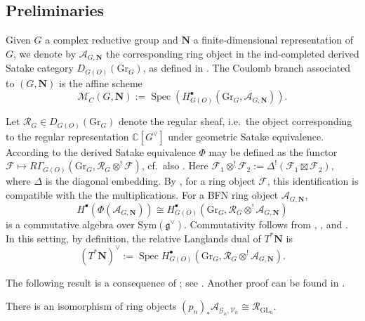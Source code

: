 \documentclass[11pt]{amsart}
\theoremstyle{definition}
\theoremstyle{plain}
\theoremstyle{remark}
\newcommand{\GL}{\mathrm{GL}}
\newcommand{\numberset}{\mathbb}
\newcommand{\C}{\numberset{C}}
\newcommand{\g}{\mathfrak{g}}
\DeclareMathOperator{\spec}{Spec}
\begin{document}
    \subsection{Preliminaries} Given $G$ a complex reductive group and $\mathbf{N}$ a finite-dimensional representation of $G$, we denote by $\mathcal{A}_{G,\mathbf{N}}$ the corresponding ring object in the ind-completed derived Satake category $D_{G(O)}(\mathrm{Gr}_G)$, as defined in \cite{BFN2018,BFN-Ring}. The Coulomb branch associated to $(G,\mathbf{N})$ is the affine scheme
    \[
        \mathcal{M}_C(G,\mathbf{N}) := \spec(H_{G(O)}^\bullet(\mathrm{Gr}_G,\mathcal{A}_{G,\mathbf{N}})).
    \]

    Let $\mathcal{R}_G \in D_{G(O)}(\mathrm{Gr}_G)$ denote the regular sheaf, i.e.\ the object corresponding to the regular representation $\C[G^\vee]$ under geometric Satake equivalence. According to \cite[Lemma 5.13(c)]{BFN-Ring} the derived Satake equivalence $\Phi$ may be defined as the functor $\mathcal{F}\mapsto R\Gamma_{G(O)}(\mathrm{Gr}_G, \mathcal{R}_G \otimes^! \mathcal{F})$, cf.\ also \cite[Section 5]{ginzburg2025pointwisepurityderivedsatake}. Here $\mathcal{F}_1\otimes^!\mathcal{F}_2:= \Delta^!(\mathcal{F}_1\boxtimes\mathcal{F}_2)$, where $\Delta$ is the diagonal embedding. By \cite[Proposition 5.15(b)]{BFN-Ring}, for a ring object $\mathcal{F}$, this identification is compatible with the the multiplications. For a BFN ring object $\mathcal{A}_{G,\mathbf{N}}$,
    \[
        H^\bullet(\Phi(\mathcal{A}_{G,\mathbf{N}})) \cong H_{G(O)}^\bullet(\mathrm{Gr}_G, \mathcal{R}_G \otimes^! \mathcal{A}_{G,\mathbf{N}})
    \]
    is a commutative algebra over $\mathrm{Sym}(\g^\vee)$. Commutativity follows from \cite[Proposition 2.5]{BFN-Ring}, \cite[Lemmas 2.2 and 2.5-2.6]{BFN2018}, and \cite{MirkovicVilonen2007}. In this setting, by definition, the relative Langlands dual of $T^*\mathbf{N}$ is
    \[
        (T^*\mathbf{N})^\vee:= \spec H_{G(O)}^\bullet(\mathrm{Gr}_G, \mathcal{R}_G \otimes^! \mathcal{A}_{G,\mathbf{N}}).
    \]

    The following result is a consequence of \cite[Theorem 2.11]{BFN-Ring}; see \cite[proof of Lemma 3.5]{gannon2025functorialitycoulombbranches}. Another proof can be found in \cite{dias2026rankinselbergdualitygluing}.

    \begin{lemma}\label{lemma-gt}
        There is an isomorphism of ring objects $(p_n)_*\mathcal{A}_{\mathcal{G}_n, \mathcal{V}_n} \cong \mathcal{R}_{\GL_n}$. %
    \end{lemma}
\end{document}
